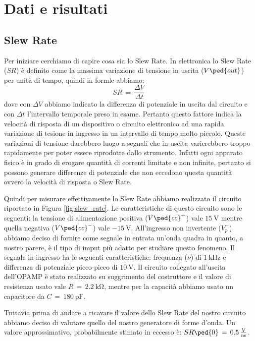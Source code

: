 \section*{Dati e risultati}

\subsection*{Slew Rate}

Per iniziare cerchiamo di capire cosa sia lo Slew Rate. In elettronica lo Slew Rate ($SR$) è definito come la massima variazione di tensione in uscita ($V\ped{out}$) per unità di tempo, quindi in formle abbiamo:
\begin{equation}
	SR\,=\,\frac{\Delta V}{\Delta t}
	\label{slew_rate_equation}
\end{equation}
dove con $\Delta V$ abbiamo indicato la differenza di potenziale in uscita dal circuito e con $\Delta t$ l'intervallo temporale preso in esame.
Pertanto questo fattore indica la velocità di risposta di un dispositivo o circuito elettronico ad una rapida variazione di tesione in ingresso in un intervallo di tempo molto piccolo. Queste variazioni di tensione darebbero luogo a segnali che in uscita varierebbero troppo rapidamente per poter essere riprodotte dallo strumento. Infatti ogni apparato fisico è in grado di erogare quantità di correnti limitate e non infinite, pertanto si possono generare differenze di potenziale che non eccedono questa quantità ovvero la velocità di risposta o Slew Rate.

Quindi per misurare effettivamente lo Slew Rate abbiamo realizzato il circuito riportato in Figura \ref{fig:slew_rate}. Le caratteristiche di questo circuito sono le seguenti: la tensione di alimentazione positiva ($V\ped{cc}^+$) vale $\SI{+15}{\volt}$ mentre quella negativa ($V\ped{cc}^-$) vale $\SI{-15}{\volt}$. All'ingresso non invertente ($V_p^+$) abbiamo deciso di fornire come segnale in entrata un'onda quadra in quanto, a nostro parere, è il tipo di imput più adatto per studiare questo fenomeno. Il segnale in ingresso ha le seguenti caratteristiche: frequenza ($\nu$) di $\SI{1}{\kilo\hertz}$ e differenza di potenziale picco-picco di $\SI{10}{\volt}$. Il circuito collegato all'uscita dell'OPAMP è stato realizzato su suggrimento del costruttore e il valore di resistenza usato vale $R\,=\,\SI{2.2}{\kilo\ohm}$, mentre per la capacità abbiamo usato un capacitore da $C\,=\,\SI{180}{\pico\farad}$.

Tuttavia prima di andare a ricavare il valore dello Slew Rate del nostro circuito abbiamo deciso di valutare quello del nostro generatore di forme d'onda. Un valore approssimativo, probabilmente stimato in eccesso è: $SR\ped{0}\,=\,0.5\,\frac{\SI{}{\volt}}{\SI{}{\nano\second}}$.

